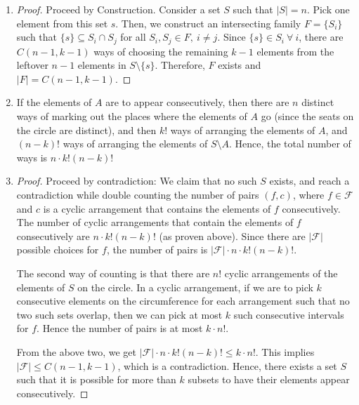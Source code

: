 \documentclass[12pt,answers]{exam}
\begin{document}
\begin{questions}
\begin{solution}
\begin{enumerate}
    \item \begin{proof} Proceed by Construction. Consider a set $S$ such that $|S| = n$. Pick one element from this set $s$. Then, we construct an intersecting family $F = \{S_i\}$ such that $\{s\} \subseteq S_i \cap S_j$ for all $S_i,S_j \in F,\ i \ne j$. Since $\{s\} \in S_i\ \forall\ i$, there are $C(n-1,k-1)$ ways of choosing the remaining $k-1$ elements from the leftover $n-1$ elements in $S \setminus \{s\}$. Therefore, $F$ exists and $|F| = C(n-1,k-1)$.
    \end{proof}
    \item If the elements of $A$ are to appear consecutively, then there are $n$ distinct ways of marking out the places where the elements of $A$ go (since the seats on the circle are distinct), and then $k!$ ways of arranging the elements of $A$, and $(n-k)!$ ways of arranging the elements of $S \setminus A$. Hence, the total number of ways is $\boxed{n\cdot k!(n-k)! }$
    \item \begin{proof}Proceed by contradiction: We claim that no such $S$ exists, and reach a contradiction while double counting the number of pairs $(f,c)$, where $f \in \mathcal{F}$ and $c$ is a cyclic arrangement that contains the elements of $f$ consecutively. The number of cyclic arrangements that contain the elements of $f$ consecutively are $n \cdot k!(n-k)!$ (as proven above). Since there are $|\mathcal{F}|$ possible choices for $f$, the number of pairs is $|\mathcal{F}| \cdot n \cdot k!(n-k)!$. 
    
    The second way of counting is that there are $n!$ cyclic arrangements of the elements of $S$ on the circle. In a cyclic arrangement, if we are to pick $k$ consecutive elements on the circumference for each arrangement such that no two such sets overlap, then we can pick at most $k$ such consecutive intervals for $f$. Hence the number of pairs is at most $k \cdot n!$.
    
    From the above two, we get $|\mathcal{F}| \cdot n \cdot k!(n-k)! \le k \cdot n!$. This implies $|\mathcal{F}| \le C(n-1,k-1)$, which is a contradiction. Hence, there exists a set $S$ such that it is possible for more than $k$ subsets to have their elements appear consecutively.\end{proof}
    

\end{enumerate}
\end{solution}
\end{questions}
\end{document}
